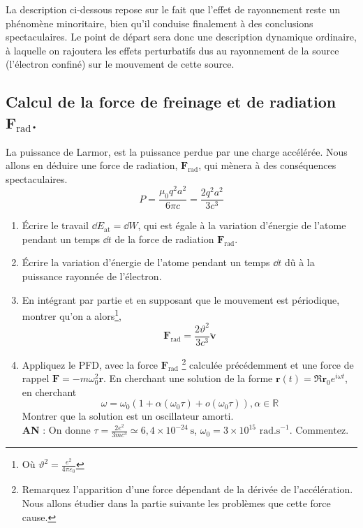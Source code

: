 \documentclass[a4paper,10pt]{report}
\newcommand{\RR}{\mathbb{R}}
\begin{document}
La description ci-dessous repose sur le fait que l'effet de rayonnement reste un phénomène minoritaire, bien qu'il conduise finalement à des conclusions spectaculaires. Le point de départ sera donc une description dynamique ordinaire, à laquelle on rajoutera les effets perturbatifs dus au rayonnement de la source (l'électron confiné) sur le mouvement de cette source.

\subsection{Calcul de la force de freinage et de radiation $\textbf{F}_\text{rad}$.}
La puissance de Larmor, est la puissance perdue par une charge accélérée. Nous allons en déduire une force de radiation, $\textbf{F}_\text{rad}$, qui mènera à des conséquences spectaculaires.
\begin{equation}
	P = \frac{\mu_0 q^2 a^2}{6\pi c} = \frac{2 q^2 a^2}{3 c^3} \tag{3.13.1} \label{eq:larmor}
\end{equation}
\begin{enumerate}
	\item Écrire le travail $\dd E_\text{at}=\dd W$, qui est égale à la variation d'énergie de l'atome pendant un temps $\dd t$ de la force de radiation $\textbf{F}_\text{rad}$.
	\item Écrire la variation d'énergie de l'atome pendant un temps $\dd t$ dû à la puissance rayonnée de l'électron.
	\item En intégrant par partie et en supposant que le mouvement est périodique, montrer qu'on a alors\footnote{Où $\vartheta^2 = \frac{e^2}{4\pi\varepsilon_0}$},
	\begin{equation}
	\textbf{F}_\text{rad} = \frac{2\vartheta^2}{3c^3}\ddot{\textbf{v}} \tag{3.13.2} \label{eq:frad}
	\end{equation}
	
	\item Appliquez le PFD, avec la force $\textbf{F}_\text{rad}$	\footnote{Remarquez l'apparition d'une force dépendant de la dérivée de l'accélération. Nous allons étudier dans la partie suivante les problèmes que cette force cause.}  calculée précédemment et une force de rappel $\textbf{F} = -m\omega_0^2 \textbf{r}$.
	En cherchant une solution de la forme $\textbf{r}(t) = \Re{\textbf{r}_0 e^{i\omega t}}$, en cherchant 
	\begin{equation}
		\omega = \omega_0(1+\alpha(\omega_0\tau) + o(\omega_0\tau)), \alpha \in \RR \tag{3.13.3}
	\end{equation} Montrer que la solution est un oscillateur amorti. 
	\\\textbf{AN} : On donne $\tau = \frac{2 e^2}{3 m c^3} \simeq 6{,}4 \times 10^{-24}~\text{s}$, $\omega_0 = 3\times 10^{15} \text{ rad.s}^{-1}$.
	Commentez.

\end{enumerate}
\end{document}
